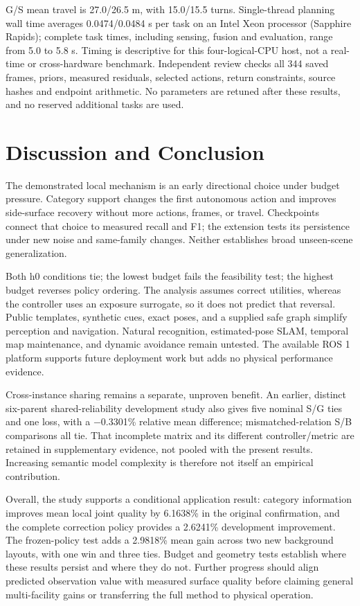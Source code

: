 \documentclass[pdflatex,sn-mathphys-num]{sn-jnl}
\begin{document}
G/S mean travel is 27.0/26.5 m, with 15.0/15.5 turns. Single-thread planning wall time averages 0.0474/0.0484 s per task on an Intel Xeon processor (Sapphire Rapids); complete task times, including sensing, fusion and evaluation, range from 5.0 to 5.8 s. Timing is descriptive for this four-logical-CPU host, not a real-time or cross-hardware benchmark. Independent review checks all 344 saved frames, priors, measured residuals, selected actions, return constraints, source hashes and endpoint arithmetic. No parameters are retuned after these results, and no reserved additional tasks are used.

\hypertarget{discussion-and-conclusion}{%
\section{Discussion and Conclusion}\label{discussion-and-conclusion}}

The demonstrated local mechanism is an early directional choice under budget pressure. Category support changes the first autonomous action and improves side-surface recovery without more actions, frames, or travel. Checkpoints connect that choice to measured recall and F1; the extension tests its persistence under new noise and same-family changes. Neither establishes broad unseen-scene generalization.

Both h0 conditions tie; the lowest budget fails the feasibility test; the highest budget reverses policy ordering. The analysis assumes correct utilities, whereas the controller uses an exposure surrogate, so it does not predict that reversal. Public templates, synthetic cues, exact poses, and a supplied safe graph simplify perception and navigation. Natural recognition, estimated-pose SLAM, temporal map maintenance, and dynamic avoidance remain untested. The available ROS 1 platform supports future deployment work but adds no physical performance evidence.

Cross-instance sharing remains a separate, unproven benefit. An earlier, distinct six-parent shared-reliability development study also gives five nominal S/G ties and one loss, with a \ensuremath{-}0.3301\% relative mean difference; mismatched-relation S/B comparisons all tie. That incomplete matrix and its different controller/metric are retained in supplementary evidence, not pooled with the present results. Increasing semantic model complexity is therefore not itself an empirical contribution.

Overall, the study supports a conditional application result: category information improves mean local joint quality by 6.1638\% in the original confirmation, and the complete correction policy provides a 2.6241\% development improvement. The frozen-policy test adds a 2.9818\% mean gain across two new background layouts, with one win and three ties. Budget and geometry tests establish where these results persist and where they do not. Further progress should align predicted observation value with measured surface quality before claiming general multi-facility gains or transferring the full method to physical operation.
\end{document}
